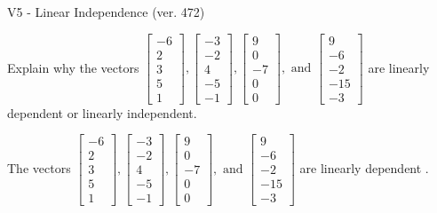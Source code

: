 \begin{exercise}
  \begin{exerciseTitle}V5 - Linear Independence (ver. 472)\end{exerciseTitle}
  \begin{exerciseStatement}
    Explain why the vectors \(\left[\begin{array}{r}
-6 \\
2 \\
3 \\
5 \\
1
\end{array}\right] , \left[\begin{array}{r}
-3 \\
-2 \\
4 \\
-5 \\
-1
\end{array}\right] , \left[\begin{array}{r}
9 \\
0 \\
-7 \\
0 \\
0
\end{array}\right] , \text{ and } \left[\begin{array}{r}
9 \\
-6 \\
-2 \\
-15 \\
-3
\end{array}\right]\) are linearly dependent or linearly independent.	


  \end{exerciseStatement}
  \begin{exerciseAnswer}
   The vectors \(\left[\begin{array}{r}
-6 \\
2 \\
3 \\
5 \\
1
\end{array}\right] , \left[\begin{array}{r}
-3 \\
-2 \\
4 \\
-5 \\
-1
\end{array}\right] , \left[\begin{array}{r}
9 \\
0 \\
-7 \\
0 \\
0
\end{array}\right] , \text{ and } \left[\begin{array}{r}
9 \\
-6 \\
-2 \\
-15 \\
-3
\end{array}\right]\) are 
  	 linearly dependent  .
  


  \end{exerciseAnswer}
\end{exercise}